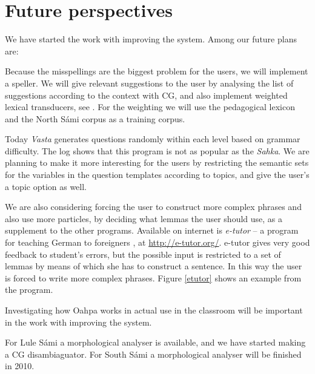 \documentclass[11pt]{article}
\begin{document}
\section{Future perspectives}
We have started the work with improving the system. Among our future plans are:
\begin{description}
\setlength{\itemsep}{-0.1cm}
\item [Implementing a speller.] Because the misspellings are the biggest problem for the users, we will implement a speller. We will give relevant suggestions to the user by analysing the list of suggestions according to the context with CG, and also implement weighted lexical transducers, see \cite{Linden:09}. For the weighting we will use the pedagogical lexicon and the North Sámi corpus as a training corpus.
\item [Implementing a topic option in \textit{Vasta}.] Today \textit{Vasta} generates questions randomly within each level based on grammar difficulty. The log shows that this program is not as popular as the \textit{Sahka}. We are planning to make it more interesting for the users by restricting the semantic sets for the variables in the question templates according to topics, and give the user's a topic option as well.
\item [Sentence building from a fixed set of lemmas.] We are also considering forcing the user to construct more complex phrases and also use more particles, by deciding what lemmas the user should use, as a supplement to the other programs. Available on internet is \textit{e-tutor} -- a program for teaching German to foreigners \cite{Heift:01}, at \url{http://e-tutor.org/}. e-tutor gives very good feedback to student's errors, but the possible input is restricted to a set of lemmas by means of which she has to construct a sentence. In this way the user is forced to write more complex phrases. Figure \ref{etutor} shows an example from the program.
\item [Conduct studies on Oahpa in actual use.] Investigating how Oahpa works in actual use in the classroom will be important in the work with improving the system.
\item [Porting the programs to more Sámi languages.] For Lule Sámi a morphological analyser is available, and we have started making a CG disambiaguator. For South Sámi a morphological analyser will be finished in 2010. 
  \end{description} 
  \vspace{0.7cm}
\end{document}
